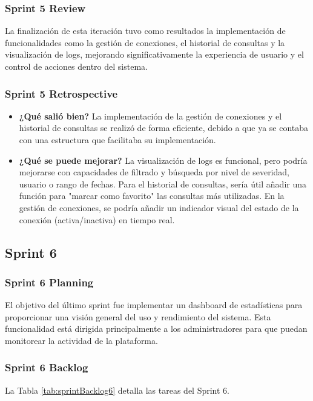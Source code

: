 \subsubsection{Sprint 5 Review}
La finalización de esta iteración tuvo como resultados la implementación de funcionalidades como la gestión de conexiones, el historial de consultas y la visualización de logs, mejorando significativamente la experiencia de usuario y el control de acciones dentro del sistema.

\subsubsection{Sprint 5 Retrospective}
\begin{itemize}
    \item \textbf{¿Qué salió bien?} \newline
    La implementación de la gestión de conexiones y el historial de consultas se realizó de forma eficiente, debido a que ya se contaba con una estructura que facilitaba su implementación.
    
    \item \textbf{¿Qué se puede mejorar?} \newline
    La visualización de logs es funcional, pero podría mejorarse con capacidades de filtrado y búsqueda por nivel de severidad, usuario o rango de fechas. Para el historial de consultas, sería útil añadir una función para "marcar como favorito" las consultas más utilizadas. En la gestión de conexiones, se podría añadir un indicador visual del estado de la conexión (activa/inactiva) en tiempo real.
    
\end{itemize}

\subsection{Sprint 6}
\subsubsection{Sprint 6 Planning}
El objetivo del último sprint fue implementar un dashboard de estadísticas para proporcionar una visión general del uso y rendimiento del sistema. Esta funcionalidad está dirigida principalmente a los administradores para que puedan monitorear la actividad de la plataforma.

\subsubsection{Sprint 6 Backlog}
La Tabla \ref{tab:sprintBacklog6} detalla las tareas del Sprint 6.

